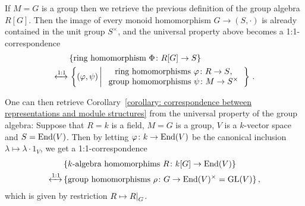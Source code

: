 \begin{remark}
  If $M = G$ is a group then we retrieve the previous definition of the group algebra $R[G]$.
  Then the image of every monoid homomorphism $G \to (S,\cdot)$ is already contained in the unit group $S^\times$, and the universal property above becomes a 1:1-correspondence
  \begin{align*}
                         &\,  \{ \text{ring homomorphism $\Phi \colon R[G] \to S$} \} \\
    \xleftrightarrow{1:1}&\,  \left\{
                                (\varphi, \psi)
                              \suchthat*
                                \begin{tabular}{c}
                                  ring homomorphisms $\varphi \colon R \to S$, \\
                                  group homomorphisms $\psi \colon M \to S^\times$
                                \end{tabular}
                              \right\} \,.
  \end{align*}
  
  One can then retrieve Corollary~\ref{corollary: correspondence between representations and module structures} from the universal property of the group algebra:
  Suppose that $R = k$ is a field, $M = G$ is a group, $V$ is a $k$-vector space and $S = \operatorname{End}(V)$.
  Then by letting $\varphi \colon k \to \operatorname{End}(V)$ be the canonical inclusion $\lambda \mapsto \lambda \cdot 1_V$, we get a 1:1-correspondence
  \begin{align*}
                         &\,  \{ \text{$k$-algebra homomorphims $R \colon k[G] \to \operatorname{End}(V)$} \} \\
    \xleftrightarrow{1:1}&\,  \{ \text{group homomorphisms $\rho \colon G \to \operatorname{End}(V)^\times = \operatorname{GL}(V)$} \} \,,
  \end{align*}
  which is given by restriction $R \mapsto \restrict{R}{G}$.
\end{remark}


